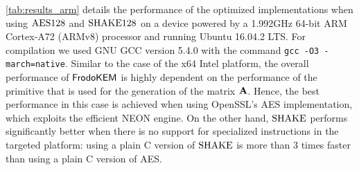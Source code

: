 \documentclass{iacrcc}
\begin{document}
\else

\autoref{tab:results_arm} details the performance of the optimized implementations when using
$\textrm{\upshape\mdseries AES128}$ and $\textrm{\upshape\mdseries SHAKE}128$ on a device powered by a 1.992GHz 64-bit ARM Cortex-A72 (ARMv8)
processor and running Ubuntu 16.04.2 LTS. 
For compilation we used GNU GCC version 5.4.0 with the command {\tt gcc -O3 -march=native}. 
Similar to the case of the x64 Intel platform, the overall performance of $\textsf{\upshape\mdseries FrodoKEM}$ is highly
dependent on the performance of the primitive that is used for the generation of the matrix $\mathbf{A}$.
Hence, the best performance in this case is achieved when using OpenSSL's AES implementation, which
exploits the efficient NEON engine. On the other hand, $\textrm{\upshape\mdseries SHAKE}$ performs significantly better when
there is no support for specialized instructions in the targeted platform: using a plain C version
of $\textrm{\upshape\mdseries SHAKE}$ is more than 3 times faster than using a plain C version of AES.
\fi
\end{document}
